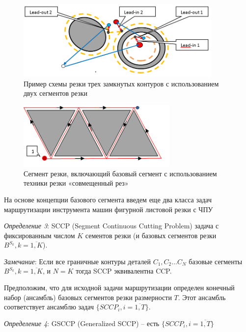 \documentclass[12pt,twoside]{report}
\newcounter{lem}
\begin{document}
\begin{figure}
  \begin{center}
  \includegraphics[width=0.9\textwidth]{cut2-1.png}
  \caption{Пример схемы резки трех замкнутых контуров с использованием двух сегментов резки}
  \label{cut2-1}
  \end{center}
\end{figure}

\begin{figure}
  \begin{center}
  \includegraphics[width=0.7\textwidth]{cut4-3.png}
  \caption{Сегмент резки, включающий базовый сегмент с использованием техники резки «совмещенный рез»}
  \label{cut4-3}
  \end{center}
\end{figure}

На основе концепции базового сегмента введем еще
два класса задач маршрутизации инструмента машин
фигурной листовой резки с ЧПУ

{\it Определение 3}:
SCCP (Segment Continuous Cutting Problem)
задача с фиксированным числом $K$
сементов резки (и базовых сегментов резки
$B^{S_k}, k = \overline{1, K}$).

{\it Замечание}:
Если все граничные контуры деталей
$C_1, C_2 \dots C_N$
базовые сегменты $B^{S_k}, k = \overline{1,K}$,
и $N=K$
тогда SCCP эквивалентна CCP.

Предположим, что для исходной задачи маршрутизации
определен конечный набор (ансамбль)
базовых сегментов резки размерности $T$.
Этот ансамбль соответствует ансамблю задач
$\{SCCP_i, i =\overline{1,T}\}$.

{\it Определение 4}:
GSCCP (Generalized SCCP) -- есть
$\{SCCP_i, i =\overline{1,T}\}$
\end{document}

